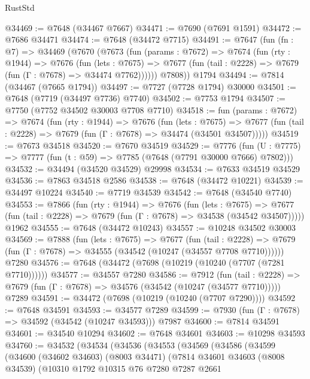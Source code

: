 \begin{lexlean}{RustStd}
\begin{coremodule}
@34469 := @7648 (@34467 @7667)
@34471 := @7690 (@7691 @1591)
@34472 := @7686 @34471
@34474 := @7648 (@34472 @7715)
@34491 := @7647
    (fun (fn : @7) =>
    @34469
      (@7670
        (@7673
          (fun (params : @7672) =>
          @7674
            (fun (rty : @1944) =>
            @7676
              (fun (lets : @7675) =>
              @7677 (fun (tail : @2228) => @7679 (fun (Γ : @7678) => @34474 @7762))))))
        @7808))
    @1794
@34494 := @7814 (@34467 (@7665 @1794))
@34497 := @7727 (@7728 @1794) @30000
@34501 := @7648 (@7719 (@34497 @7736) @7740)
@34502 := @7753 @1794
@34507 := @7750 (@7752 @34502 @30003 @7708 @7710)
@34518 := fun (params : @7672) =>
  @7674
    (fun (rty : @1944) =>
    @7676
      (fun (lets : @7675) =>
      @7677 (fun (tail : @2228) => @7679 (fun (Γ : @7678) => @34474 (@34501 @34507)))))
@34519 := @7673 @34518
@34520 := @7670 @34519
@34529 := @7776
    (fun (U : @7775) => @7777 (fun (t : @59) => @7785 (@7648 (@7791 @30000 @7666) @7802)))
@34532 := @34494 (@34520 @34529) @29998
@34534 := @7633 @34519 @34529
@34536 := @7863 @34518 @2586
@34538 := @7648 (@34472 @10221)
@34539 := @34497 @10224
@34540 := @7719 @34539
@34542 := @7648 (@34540 @7740)
@34553 := @7866
    (fun (rty : @1944) =>
    @7676
      (fun (lets : @7675) =>
      @7677 (fun (tail : @2228) => @7679 (fun (Γ : @7678) => @34538 (@34542 @34507)))))
    @1962
@34555 := @7648 (@34472 @10243)
@34557 := @10248 @34502 @30003
@34569 := @7888
    (fun (lets : @7675) =>
    @7677
      (fun (tail : @2228) =>
      @7679 (fun (Γ : @7678) => @34555 (@34542 (@10247 (@34557 @7708 @7710))))))
    @7280
@34576 := @7648 (@34472 (@7698 (@10219 (@10240 (@7707 (@7281 @7710))))))
@34577 := @34557 @7280
@34586 := @7912
    (fun (tail : @2228) => @7679 (fun (Γ : @7678) => @34576 (@34542 (@10247 (@34577 @7710)))))
    @7289
@34591 := @34472 (@7698 (@10219 (@10240 (@7707 @7290))))
@34592 := @7648 @34591
@34593 := @34577 @7289
@34599 := @7930 (fun (Γ : @7678) => @34592 (@34542 (@10247 @34593))) @7987
@34600 := @7814 @34591
@34601 := @34540 @10294
@34602 := @7648 @34601
@34603 := @10298 @34593
@34760 := @34532
    (@34534
      (@34536
        (@34553
          (@34569
            (@34586
              (@34599
                (@34600
                  (@34602 @34603)
                  (@8003 @34471)
                  (@7814
                    @34601
                    @34603
                    (@8008 @34539)
                    (@10310
                      @1792
                      @10315
                      @76
                      @7280
                      @7287
                      @2661

\end{coremodule}
\end{lexlean}
